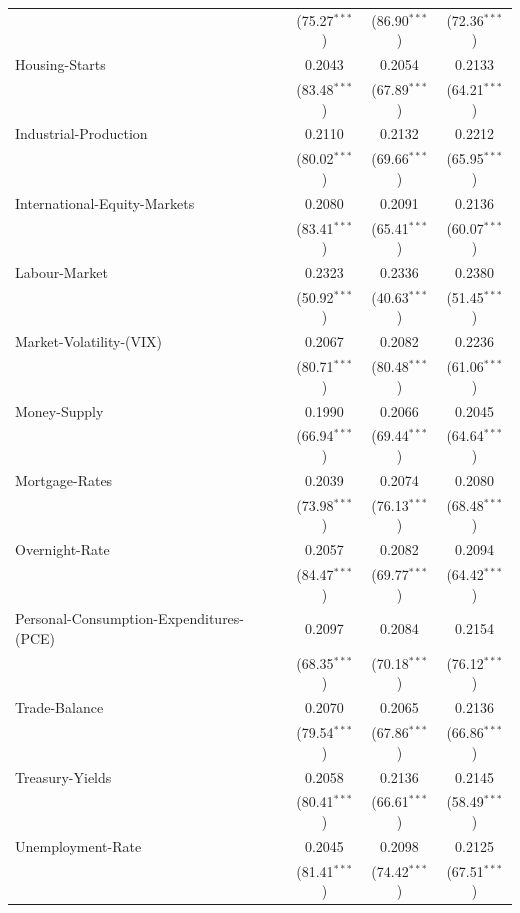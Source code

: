 \begin{tabular}{lccc}
 & (75.27$^{***}$) & (86.90$^{***}$) & (72.36$^{***}$) \\
Housing-Starts & 0.2043 & 0.2054 & 0.2133 \\
 & (83.48$^{***}$) & (67.89$^{***}$) & (64.21$^{***}$) \\
Industrial-Production & 0.2110 & 0.2132 & 0.2212 \\
 & (80.02$^{***}$) & (69.66$^{***}$) & (65.95$^{***}$) \\
International-Equity-Markets & 0.2080 & 0.2091 & 0.2136 \\
 & (83.41$^{***}$) & (65.41$^{***}$) & (60.07$^{***}$) \\
Labour-Market & 0.2323 & 0.2336 & 0.2380 \\
 & (50.92$^{***}$) & (40.63$^{***}$) & (51.45$^{***}$) \\
Market-Volatility-(VIX) & 0.2067 & 0.2082 & 0.2236 \\
 & (80.71$^{***}$) & (80.48$^{***}$) & (61.06$^{***}$) \\
Money-Supply & 0.1990 & 0.2066 & 0.2045 \\
 & (66.94$^{***}$) & (69.44$^{***}$) & (64.64$^{***}$) \\
Mortgage-Rates & 0.2039 & 0.2074 & 0.2080 \\
 & (73.98$^{***}$) & (76.13$^{***}$) & (68.48$^{***}$) \\
Overnight-Rate & 0.2057 & 0.2082 & 0.2094 \\
 & (84.47$^{***}$) & (69.77$^{***}$) & (64.42$^{***}$) \\
Personal-Consumption-Expenditures-(PCE) & 0.2097 & 0.2084 & 0.2154 \\
 & (68.35$^{***}$) & (70.18$^{***}$) & (76.12$^{***}$) \\
Trade-Balance & 0.2070 & 0.2065 & 0.2136 \\
 & (79.54$^{***}$) & (67.86$^{***}$) & (66.86$^{***}$) \\
Treasury-Yields & 0.2058 & 0.2136 & 0.2145 \\
 & (80.41$^{***}$) & (66.61$^{***}$) & (58.49$^{***}$) \\
Unemployment-Rate & 0.2045 & 0.2098 & 0.2125 \\
 & (81.41$^{***}$) & (74.42$^{***}$) & (67.51$^{***}$) \\
\hline
\end{tabular}
